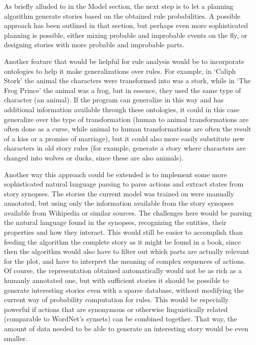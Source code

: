 As briefly alluded to in the Model section, the next step is to let a planning
algorithm generate stories based on the obtained rule probabilities. A possible
approach has been outlined in that section, but perhaps even more sophisticated
planning is possible, either mixing probable and improbable events on the fly,
or designing stories with more probable and improbable parts.

Another feature that would be helpful for rule analysis would be to incorporate
ontologies to help it make generalizations over rules.
For example, in `Caliph Stork' the animal the characters were transformed into
was a stork, while in `The Frog Prince' the animal was a frog, but in essence,
they used the same type of character (an animal). If the program can generalize
in this way and has additional information available through these ontologies,
it could in this case generalize over the type of transformation (human to
animal transformations are often done as a curse, while animal to human
transformations are often the result of a kiss or a promise of marriage), but it
could also more easily substitute new characters in old story rules (for
example, generate a story where characters are changed into wolves or ducks,
since these are also animals).

Another way this approach could be extended is to implement some more sophisticated
natural language parsing to parse actions and extract states from story synopses.
The stories the current model was trained
on were manually annotated, but using only the information available from the
story synopses available from Wikipedia or similar sources. The challenges here
would be parsing the natural language found in the synopses, recognizing the
entities, their properties and how they interact.
This would still be easier to accomplish than feeding the algorithm the complete
story as it might be found in a book, since then the algorithm would also have
to filter out which parts are actually relevant for the plot, and have to
interpret the meaning of complex sequences of actions.
Of course, the representation obtained automatically would not be as rich as a
humanly annotated one, but with sufficient stories it should be possible to
generate interesting stories even with a sparse database, without modifying the
current way of probability computation for rules. This would be especially
powerful if actions that are synonymous or otherwise linguistically related
(comparable to WordNet's synsets) can be combined together. That way, the amount
of data needed to be able to generate an interesting story would be even
smaller.

